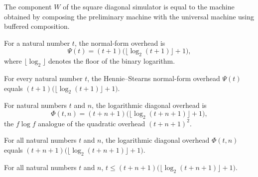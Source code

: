 \begin{theorem}
\label{Complexity.TimeHierarchy.sqDiagSimulator_W}
\leanok
{}
The component $W$ of the square diagonal simulator is equal to the machine obtained by
composing the preliminary machine with the universal machine using buffered composition.
\end{theorem}

\begin{definition}
\label{Complexity.TimeHierarchy.logOverhead}
\leanok
For a natural number $t$, the normal-form overhead is
\[\Psi(t) = (t+1)\bigl(\lfloor\log_2(t+1)\rfloor+1\bigr),\]
where $\lfloor\log_2\rfloor$ denotes the floor of the binary logarithm.
\end{definition}

\begin{theorem}
\label{Complexity.TimeHierarchy.logOverhead_eq}
\leanok
{}
For every natural number $t$, the Hennie--Stearns normal-form overhead $\Psi(t)$ equals
$(t+1)\bigl(\lfloor\log_2(t+1)\rfloor+1\bigr)$.
\end{theorem}

\begin{definition}
\label{Complexity.TimeHierarchy.logDiagOverhead}
\leanok
For natural numbers $t$ and $n$, the logarithmic diagonal overhead is
\[\Phi(t,n) = (t+n+1)\bigl(\lfloor\log_2(t+n+1)\rfloor+1\bigr),\]
the $f\log f$ analogue of the quadratic overhead $(t+n+1)^2$.
\end{definition}

\begin{theorem}
\label{Complexity.TimeHierarchy.logDiagOverhead_eq}
\leanok
{}
For all natural numbers $t$ and $n$, the logarithmic diagonal overhead $\Phi(t,n)$ equals
$(t+n+1)\bigl(\lfloor\log_2(t+n+1)\rfloor+1\bigr)$.
\end{theorem}

\begin{theorem}
\label{Complexity.TimeHierarchy.le_logDiagOverhead}
\leanok
{}
For all natural numbers $t$ and $n$,
$t \le (t+n+1)\bigl(\lfloor\log_2(t+n+1)\rfloor+1\bigr)$.
\end{theorem}

